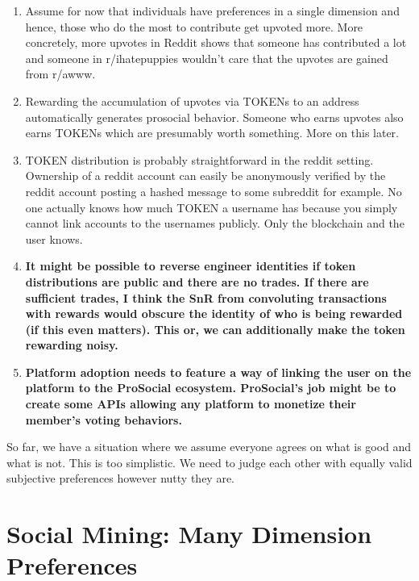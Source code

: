 \documentclass[12pt]{article}
\begin{document}
\begin{enumerate}
	\item Assume for now that individuals have preferences in a single dimension and hence, those who do the most to contribute get upvoted more. More concretely, more upvotes in Reddit shows that someone has contributed a lot and someone in r/ihatepuppies wouldn't care that the upvotes are gained from r/awww.
	
	\item Rewarding the accumulation of upvotes via TOKENs to an address automatically generates prosocial behavior. Someone who earns upvotes also earns TOKENs which are presumably worth something. More on this later.
	
	\item TOKEN distribution is probably straightforward in the reddit setting. Ownership of a reddit account can easily be anonymously verified by the reddit account posting a hashed message to some subreddit for example. No one actually knows how much TOKEN a username has because you simply cannot link accounts to the usernames publicly. Only the blockchain and the user knows. 
	
	\item \textbf{It might be possible to reverse engineer identities if token distributions are public and there are no trades. If there are sufficient trades, I think the SnR from convoluting transactions with rewards would obscure the identity of who is being rewarded (if this even matters). This or, we can additionally make the token rewarding noisy.} 
	
	\item \textbf{Platform adoption needs to feature a way of linking the user on the platform to the ProSocial ecosystem. ProSocial's job might be to create some APIs allowing any platform to monetize their member's voting behaviors.}
	
\end{enumerate}

So far, we have a situation where we assume everyone agrees on what is good and what is not. This is too simplistic. We need to judge each other with equally valid subjective preferences however nutty they are.

\section*{Social Mining: Many Dimension Preferences}
\end{document}

